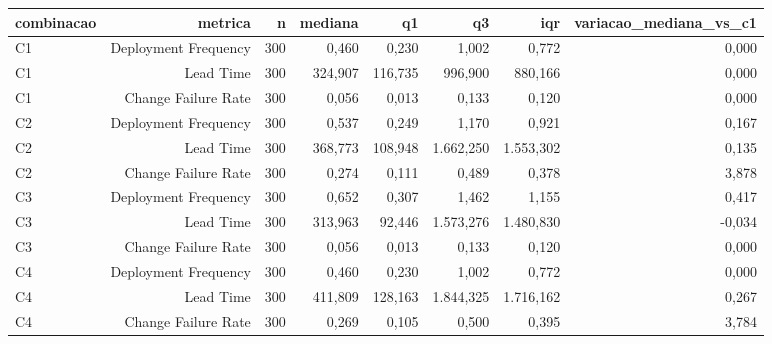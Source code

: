 \begin{tabular}{lrrrrrrr}
\hline
combinacao & metrica & n & mediana & q1 & q3 & iqr & variacao\_mediana\_vs\_c1 \\
\hline
C1 & Deployment Frequency & 300 & 0,460 & 0,230 & 1,002 & 0,772 & 0,000 \\
C1 & Lead Time & 300 & 324,907 & 116,735 & 996,900 & 880,166 & 0,000 \\
C1 & Change Failure Rate & 300 & 0,056 & 0,013 & 0,133 & 0,120 & 0,000 \\
C2 & Deployment Frequency & 300 & 0,537 & 0,249 & 1,170 & 0,921 & 0,167 \\
C2 & Lead Time & 300 & 368,773 & 108,948 & 1.662,250 & 1.553,302 & 0,135 \\
C2 & Change Failure Rate & 300 & 0,274 & 0,111 & 0,489 & 0,378 & 3,878 \\
C3 & Deployment Frequency & 300 & 0,652 & 0,307 & 1,462 & 1,155 & 0,417 \\
C3 & Lead Time & 300 & 313,963 & 92,446 & 1.573,276 & 1.480,830 & -0,034 \\
C3 & Change Failure Rate & 300 & 0,056 & 0,013 & 0,133 & 0,120 & 0,000 \\
C4 & Deployment Frequency & 300 & 0,460 & 0,230 & 1,002 & 0,772 & 0,000 \\
C4 & Lead Time & 300 & 411,809 & 128,163 & 1.844,325 & 1.716,162 & 0,267 \\
C4 & Change Failure Rate & 300 & 0,269 & 0,105 & 0,500 & 0,395 & 3,784 \\
\hline
\end{tabular}
